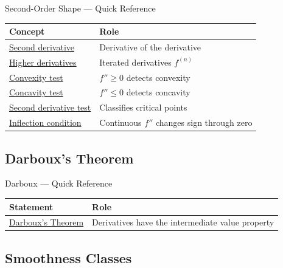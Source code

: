 \begin{toolkitbox}{Second-Order Shape --- Quick Reference}
\small
\begin{tabular}{l l}
\toprule
\textbf{Concept} & \textbf{Role} \\
\midrule
\hyperref[def:second-derivative]{Second derivative} & Derivative of the derivative \\
\hyperref[def:higher-derivatives]{Higher derivatives} & Iterated derivatives \(f^{(n)}\) \\
\hyperref[thm:second-derivative-convexity-test]{Convexity test} & \(f''\geq 0\) detects convexity \\
\hyperref[thm:second-derivative-concavity-test]{Concavity test} & \(f''\leq 0\) detects concavity \\
\hyperref[thm:second-derivative-test]{Second derivative test} & Classifies critical points \\
\hyperref[prop:inflection-point-necessary-condition]{Inflection condition} & Continuous \(f''\) changes sign through zero \\
\bottomrule
\end{tabular}
\end{toolkitbox}



\subsection{Darboux's Theorem}

\begin{toolkitbox}{Darboux --- Quick Reference}
\small
\begin{tabular}{l l}
\toprule
\textbf{Statement} & \textbf{Role} \\
\midrule
\hyperref[thm:darboux]{Darboux's Theorem} & Derivatives have the intermediate value property \\
\bottomrule
\end{tabular}
\end{toolkitbox}



\subsection{Smoothness Classes}

